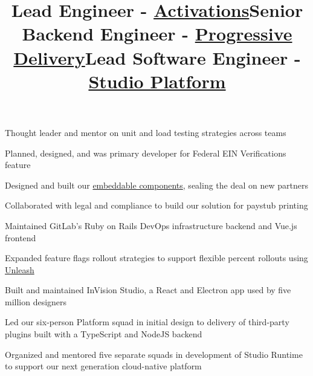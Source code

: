 \documentclass[12pt, tweaklist, line]{res}
\let\tempone\itemize
\let\temptwo\enditemize
\renewenvironment{itemize}{\tempone\vspace{-.15in}\setlength{\topsep}{0pt}\setlength{\itemsep}{3pt}\vspace{-.15in}}{\temptwo}
\begin{document}
\begin{resume}
\title{Lead Engineer - \href{https://www.checkhq.com/solutions/who-we-serve}{Activations}}
\begin{position}
\begin{itemize}
\item Thought leader and mentor on unit and load testing strategies across teams
\item Planned, designed, and was primary developer for Federal EIN Verifications feature
\item Designed and built our \href{https://www.checkhq.com/platform/embedded-payroll}{embeddable components}, sealing the deal on new partners
\item Collaborated with legal and compliance to build our solution for paystub printing
\end{itemize}
\end{position}

\title{Senior Backend Engineer - \href{https://about.gitlab.com/handbook/engineering/development/ops/release/progressive-delivery/}{Progressive Delivery}}
\begin{position}
\begin{itemize}
\item Maintained GitLab's Ruby on Rails DevOps infrastructure backend and Vue.js frontend
\item Expanded feature flags rollout strategies to support flexible percent rollouts using \href{https://unleash.github.io/}{Unleash}
\end{itemize}
\end{position}

\title{Lead Software Engineer - \href{https://www.invisionapp.com/studio}{Studio Platform}}
\begin{position}
\begin{itemize}
\item Built and maintained InVision Studio, a React and Electron app used by five million designers
\item Led our six-person Platform squad in initial design to delivery of third-party plugins built with a TypeScript and NodeJS backend
\item Organized and mentored five separate squads in development of Studio Runtime to support our next generation cloud-native platform
\end{itemize}
\end{position}


\end{resume}
\end{document}
